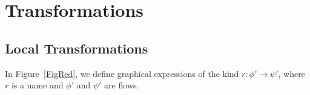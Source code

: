 \chapter{Transformations}

\section{Local Transformations}

\begin{definition}
In Figure~\ref{FigRed}, we define graphical expressions of the kind $r\colon\phi'\to\psi'$, where $r$ is a name and $\phi'$ and $\psi'$ are flows.
\end{definition}

\newcommand{\rwdcd}{{{\mathsf w}{\downarrow}{\hbox{-}}{\mathsf c}{\downarrow}}}
\newcommand{\rwdiu}{{{\mathsf w}{\downarrow}{\hbox{-}}{\mathsf i}{\uparrow  }}}
\newcommand{\rwdwu}{{{\mathsf w}{\downarrow}{\hbox{-}}{\mathsf w}{\uparrow  }}}
\newcommand{\rwdcu}{{{\mathsf w}{\downarrow}{\hbox{-}}{\mathsf c}{\uparrow  }}}
\newcommand{\rcuwu}{{{\mathsf c}{\uparrow  }{\hbox{-}}{\mathsf w}{\uparrow  }}}
\newcommand{\rcdwu}{{{\mathsf c}{\downarrow}{\hbox{-}}{\mathsf w}{\uparrow  }}}
\newcommand{\rcdiu}{{{\mathsf c}{\downarrow}{\hbox{-}}{\mathsf i}{\uparrow  }}}
\newcommand{\rcdcu}{{{\mathsf c}{\downarrow}{\hbox{-}}{\mathsf c}{\uparrow  }}}
\newcommand{\ridwu}{{{\mathsf i}{\downarrow}{\hbox{-}}{\mathsf w}{\uparrow  }}}
\newcommand{\ridcu}{{{\mathsf i}{\downarrow}{\hbox{-}}{\mathsf c}{\uparrow  }}}
\newcommand{\rcd}{{\mathsf c}{\downarrow  }}
\newcommand{\rcu}{{\mathsf c}{\uparrow  }}
